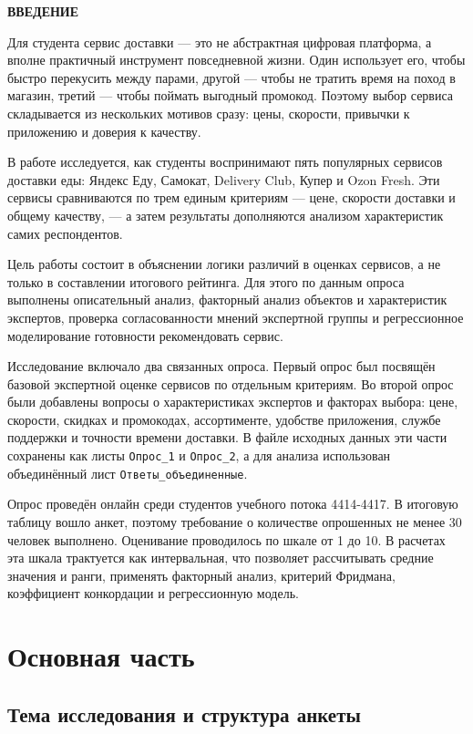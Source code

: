 \documentclass[14pt,a4paper]{extarticle}
\newcommand{\structsection}[1]{%
    \clearpage\phantomsection%
    \begin{center}{\bfseries \MakeUppercase{#1}}\end{center}%
    \addcontentsline{toc}{section}{#1}%
}
\begin{document}
\tableofcontents

\structsection{Введение}

Для студента сервис доставки — это не абстрактная цифровая платформа, а вполне практичный инструмент повседневной жизни. Один использует его, чтобы быстро перекусить между парами, другой — чтобы не тратить время на поход в магазин, третий — чтобы поймать выгодный промокод. Поэтому выбор сервиса складывается из нескольких мотивов сразу: цены, скорости, привычки к приложению и доверия к качеству.

В работе исследуется, как студенты воспринимают пять популярных сервисов доставки еды: Яндекс Еду, Самокат, Delivery Club, Купер и Ozon Fresh. Эти сервисы сравниваются по трем единым критериям — цене, скорости доставки и общему качеству, — а затем результаты дополняются анализом характеристик самих респондентов.

Цель работы состоит в объяснении логики различий в оценках сервисов, а не только в составлении итогового рейтинга. Для этого по данным опроса выполнены описательный анализ, факторный анализ объектов и характеристик экспертов, проверка согласованности мнений экспертной группы и регрессионное моделирование готовности рекомендовать сервис.

Исследование включало два связанных опроса. Первый опрос был посвящён базовой экспертной оценке сервисов по отдельным критериям. Во второй опрос были добавлены вопросы о характеристиках экспертов и факторах выбора: цене, скорости, скидках и промокодах, ассортименте, удобстве приложения, службе поддержки и точности времени доставки. В файле исходных данных эти части сохранены как листы \texttt{Опрос\_1} и \texttt{Опрос\_2}, а для анализа использован объединённый лист \texttt{Ответы\_объединенные}.

Опрос проведён онлайн среди студентов учебного потока 4414-4417. В итоговую таблицу вошло \NRespondents{} анкет, поэтому требование о количестве опрошенных не менее 30 человек выполнено. Оценивание проводилось по шкале от 1 до 10. В расчетах эта шкала трактуется как интервальная, что позволяет рассчитывать средние значения и ранги, применять факторный анализ, критерий Фридмана, коэффициент конкордации и регрессионную модель.

\clearpage
\section{Основная часть}

\subsection{Тема исследования и структура анкеты}
\end{document}
